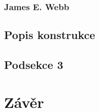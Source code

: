 \documentclass[a4paper,11pt]{article}
\begin{document}
\subsubsection{James E. Webb}
\subsection{Popis konstrukce}
\subsection{Podsekce 3}

\section{Závěr}

\newpage


\def\refname{Použitá literatura}

\end{document}
